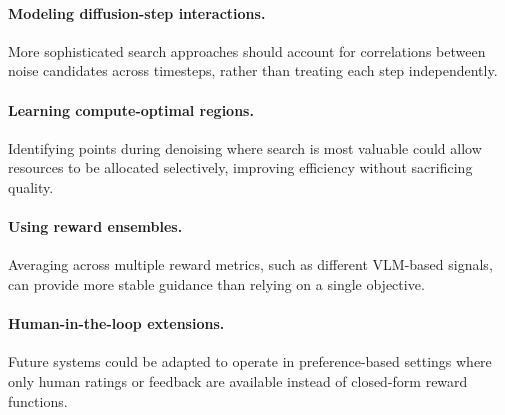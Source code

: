 \documentclass{article}
\begin{document}
\paragraph{Modeling diffusion-step interactions.} More sophisticated search approaches should account for correlations between noise candidates across timesteps, rather than treating each step independently.  

\paragraph{Learning compute-optimal regions.} Identifying points during denoising where search is most valuable could allow resources to be allocated selectively, improving efficiency without sacrificing quality.  

\paragraph{Using reward ensembles.} Averaging across multiple reward metrics, such as different VLM-based signals, can provide more stable guidance than relying on a single objective.  

\paragraph{Human-in-the-loop extensions.} Future systems could be adapted to operate in preference-based settings where only human ratings or feedback are available instead of closed-form reward functions.  


    
    
\end{document}
